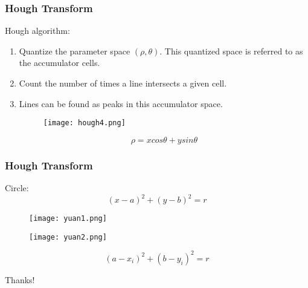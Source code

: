 \documentclass[notheorems,serif,table,compress]{beamer}  %
\begin{document}
\begin{frame}
\frametitle{Hough Transform}
{\color{blue}Hough algorithm:}
\begin{enumerate}
\item Quantize the parameter space $(\rho,\theta)$. This quantized space is referred to as the accumulator cells.
\item Count the number of times a line intersects a given cell.
\item Lines can be found as peaks in this accumulator space.
    \begin{figure}
    \texttt{[image: hough4.png]}
    \end{figure}
    \begin{displaymath}
    \rho=xcos\theta + ysin\theta
    \end{displaymath}
\end{enumerate}
\end{frame}

\begin{frame}
\frametitle{Hough Transform}
{\color{blue}Circle:}
\begin{displaymath}
(x-a)^{2}+(y-b)^{2}=r
\end{displaymath}
    \begin{figure}
    \begin{minipage}[t]{0.4\linewidth}
    \texttt{[image: yuan1.png]} 
    \end{minipage}
    \quad
    \begin{minipage}[t]{0.4\linewidth}
    \texttt{[image: yuan2.png]} 
    \end{minipage}
    \end{figure}
    \begin{displaymath}
    (a-x_{i})^{2}+(b-y_{i})^{2}=r
    \end{displaymath}
\end{frame}

\begin{frame}
  \vspace{2cm}
  \centering
  \color{blue}\Huge{Thanks!}
  \vspace{1.5cm}
 

\end{frame}
\end{document}
